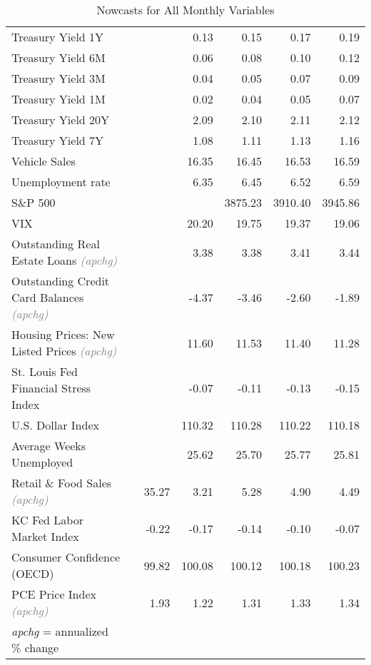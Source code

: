 \documentclass[11pt, letterpaper]{article}\usepackage[]{graphicx}\usepackage[]{color}
\begin{document}
\begin{table}[H]
\begin{tabular}{lrrrrrr}
  Treasury Yield 1Y &  &  & 0.13 & 0.15 & 0.17 & 0.19 \\ 
  Treasury Yield 6M &  &  & 0.06 & 0.08 & 0.10 & 0.12 \\ 
  Treasury Yield 3M &  &  & 0.04 & 0.05 & 0.07 & 0.09 \\ 
  Treasury Yield 1M &  &  & 0.02 & 0.04 & 0.05 & 0.07 \\ 
  Treasury Yield 20Y &  &  & 2.09 & 2.10 & 2.11 & 2.12 \\ 
  Treasury Yield 7Y &  &  & 1.08 & 1.11 & 1.13 & 1.16 \\ 
  Vehicle Sales &  &  & 16.35 & 16.45 & 16.53 & 16.59 \\ 
  Unemployment rate &  &  & 6.35 & 6.45 & 6.52 & 6.59 \\ 
  S\&P 500 &  &  &  & 3875.23 & 3910.40 & 3945.86 \\ 
  VIX &  &  & 20.20 & 19.75 & 19.37 & 19.06 \\ 
  Outstanding Real Estate Loans \textit{\footnotesize\textcolor{gray}{(apchg)}} &  &  & 3.38 & 3.38 & 3.41 & 3.44 \\ 
  Outstanding Credit Card Balances \textit{\footnotesize\textcolor{gray}{(apchg)}} &  &  & -4.37 & -3.46 & -2.60 & -1.89 \\ 
  Housing Prices: New Listed Prices \textit{\footnotesize\textcolor{gray}{(apchg)}} &  &  & 11.60 & 11.53 & 11.40 & 11.28 \\ 
  St. Louis Fed Financial Stress Index &  &  & -0.07 & -0.11 & -0.13 & -0.15 \\ 
  U.S. Dollar Index &  &  & 110.32 & 110.28 & 110.22 & 110.18 \\ 
  Average Weeks Unemployed &  &  & 25.62 & 25.70 & 25.77 & 25.81 \\ 
  Retail \& Food Sales \textit{\footnotesize\textcolor{gray}{(apchg)}} &  & 35.27 & 3.21 & 5.28 & 4.90 & 4.49 \\ 
  KC Fed Labor Market Index &  & -0.22 & -0.17 & -0.14 & -0.10 & -0.07 \\ 
  Consumer Confidence (OECD) &  & 99.82 & 100.08 & 100.12 & 100.18 & 100.23 \\ 
  PCE Price Index \textit{\footnotesize\textcolor{gray}{(apchg)}} &  & 1.93 & 1.22 & 1.31 & 1.33 & 1.34 \\ 
   \hline 
 \textit{apchg} = annualized \% change 
\end{tabular}
\endgroup
\caption{Nowcasts for All Monthly Variables} 
\end{table}
\end{document}
